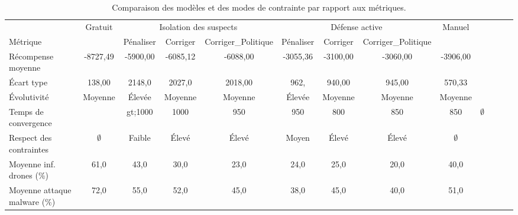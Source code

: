 \begin{table}[t]
  \centering
  \setlength{\tabcolsep}{4.5pt}
  \caption{Comparaison des modèles et des modes de contrainte par rapport aux métriques.}
  \label{tab:metrics_comparison}
  {%

    \tiny

    \begin{tabular}{lcccccccccccc}
                                   & {Gratuit}   & \multicolumn{3}{c}{Isolation des suspects} & \multicolumn{3}{c}{Défense active} & {Manuel}                                                                                     \\
      Métrique                     &             & Pénaliser                                  & Corriger                           & Corriger\_Politique & Pénaliser & Corriger & Corriger\_Politique &                           \\
      \midrule
      Récompense moyenne           & -8727,49    & -5900,00                                   & -6085,12                           & -6088,00            & -3055,36  & -3100,00 & -3060,00            & -3906,00                  \\
      Écart type                   & 138,00      & 2148,0                                     & 2027,0                             & 2018,00             & 962,      & 940,00   & 945,00              & 570,33                    \\
      Évolutivité                  & Moyenne     & Élevée                                     & Moyenne                            & Moyenne             & Élevée    & Moyenne  & Moyenne             & Moyenne                   \\
      Temps de convergence         &             & gt;1000                                    & 1000                               & 950                 & 950       & 800      & 850                 & 850         & $\emptyset$ \\
      Respect des contraintes      & $\emptyset$ & Faible                                     & Élevé                              & Élevé               & Moyen     & Élevé    & Élevé               & $\emptyset$               \\
      Moyenne inf. drones (\%)     & 61,0        & 43,0                                       & 30,0                               & 23,0                & 24,0      & 25,0     & 20,0                & 40,0                      \\
      Moyenne attaque malware (\%) & 72,0        & 55,0                                       & 52,0                               & 45,0                & 38,0      & 45,0     & 40,0                & 51,0                      \\
    \end{tabular}
  }
\end{table}

